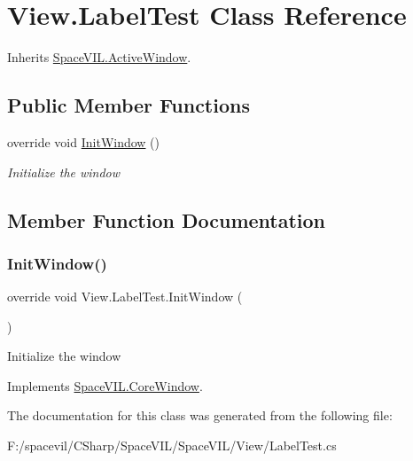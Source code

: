\hypertarget{class_view_1_1_label_test}{}\section{View.\+Label\+Test Class Reference}
\label{class_view_1_1_label_test}


Inherits \mbox{\hyperlink{class_space_v_i_l_1_1_active_window}{Space\+V\+I\+L.\+Active\+Window}}.

\subsection*{Public Member Functions}
\begin{DoxyCompactItemize}
\item 
override void \mbox{\hyperlink{class_view_1_1_label_test_afc1aadc0634c9a71494e371204bfdf08}{Init\+Window}} ()
\begin{DoxyCompactList}\small\item\em Initialize the window \end{DoxyCompactList}\end{DoxyCompactItemize}


\subsection{Member Function Documentation}
\mbox{\label{class_view_1_1_label_test_afc1aadc0634c9a71494e371204bfdf08}} 
\subsubsection{\texorpdfstring{Init\+Window()}{InitWindow()}}
{\footnotesize\ttfamily override void View.\+Label\+Test.\+Init\+Window (\begin{DoxyParamCaption}{ }\end{DoxyParamCaption})\hspace{0.3cm}{\ttfamily [virtual]}}



Initialize the window 



Implements \mbox{\hyperlink{class_space_v_i_l_1_1_core_window_aa3cf4ac54d9651b1149584dc81042824}{Space\+V\+I\+L.\+Core\+Window}}.



The documentation for this class was generated from the following file\+:\begin{DoxyCompactItemize}
\item 
F\+:/spacevil/\+C\+Sharp/\+Space\+V\+I\+L/\+Space\+V\+I\+L/\+View/Label\+Test.\+cs\end{DoxyCompactItemize}
